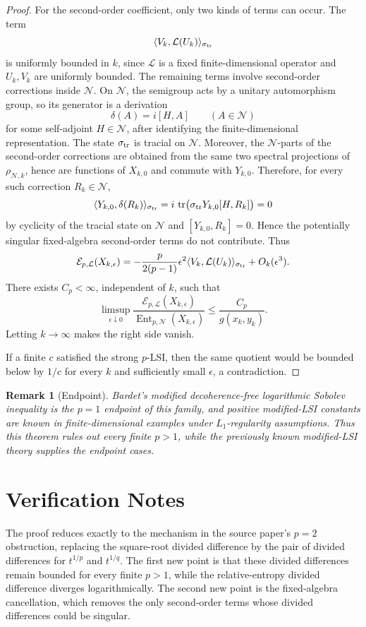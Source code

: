 \documentclass[11pt]{article}
\newtheorem{remark}{Remark}
\newcommand{\cE}{\mathcal E}
\newcommand{\cL}{\mathcal L}
\newcommand{\cN}{\mathcal N}
\newcommand{\tr}{\operatorname{tr}}
\newcommand{\Ent}{\operatorname{Ent}}
\begin{document}
\begin{proof}
For the second-order coefficient, only two kinds of terms can occur. The term
\[
  \langle V_k,\cL(U_k)\rangle_{\sigma_{\rm tr}}
\]
is uniformly bounded in \(k\), since \(\cL\) is a fixed finite-dimensional operator and \(U_k,V_k\) are uniformly bounded. The remaining terms involve second-order corrections inside \(\cN\). On \(\cN\), the semigroup acts by a unitary automorphism group, so its generator is a derivation
\[
  \delta(A)=i[H,A]\qquad(A\in\cN)
\]
for some self-adjoint \(H\in\cN\), after identifying the finite-dimensional representation. The state \(\sigma_{\rm tr}\) is tracial on \(\cN\). Moreover, the \(\cN\)-parts of the second-order corrections are obtained from the same two spectral projections of \(\rho_{\cN,k}\), hence are functions of \(X_{k,0}\) and commute with \(Y_{k,0}\). Therefore, for every such correction \(R_k\in\cN\),
\[
  \langle Y_{k,0},\delta(R_k)\rangle_{\sigma_{\rm tr}}
  =
  i\,\tr\bigl(\sigma_{\rm tr}Y_{k,0}[H,R_k]\bigr)
  =
  0
\]
by cyclicity of the tracial state on \(\cN\) and \([Y_{k,0},R_k]=0\). Hence the potentially singular fixed-algebra second-order terms do not contribute. Thus
\[
  \cE_{p,\cL}(X_{k,\epsilon})
  =
  -\frac{p}{2(p-1)}\epsilon^2
  \langle V_k,\cL(U_k)\rangle_{\sigma_{\rm tr}}
  +O_k(\epsilon^3).
\]
There exists \(C_p<\infty\), independent of \(k\), such that
\[
  \limsup_{\epsilon\downarrow0}
  \frac{\cE_{p,\cL}(X_{k,\epsilon})}
       {\Ent_{p,\cN}(X_{k,\epsilon})}
  \le
  \frac{C_p}{g(x_k,y_k)}.
\]
Letting \(k\to\infty\) makes the right side vanish.

If a finite \(c\) satisfied the strong \(p\)-LSI, then the same quotient would be bounded below by \(1/c\) for every \(k\) and sufficiently small \(\epsilon\), a contradiction.
\end{proof}

\begin{remark}[Endpoint]
Bardet's modified decoherence-free logarithmic Sobolev inequality is the \(p=1\) endpoint of this family, and positive modified-LSI constants are known in finite-dimensional examples under \(L_1\)-regularity assumptions. Thus this theorem rules out every finite \(p>1\), while the previously known modified-LSI theory supplies the endpoint cases.
\end{remark}

\section*{Verification Notes}

The proof reduces exactly to the mechanism in the source paper's \(p=2\) obstruction, replacing the square-root divided difference by the pair of divided differences for \(t^{1/p}\) and \(t^{1/q}\). The first new point is that these divided differences remain bounded for every finite \(p>1\), while the relative-entropy divided difference diverges logarithmically. The second new point is the fixed-algebra cancellation, which removes the only second-order terms whose divided differences could be singular.
\end{document}
